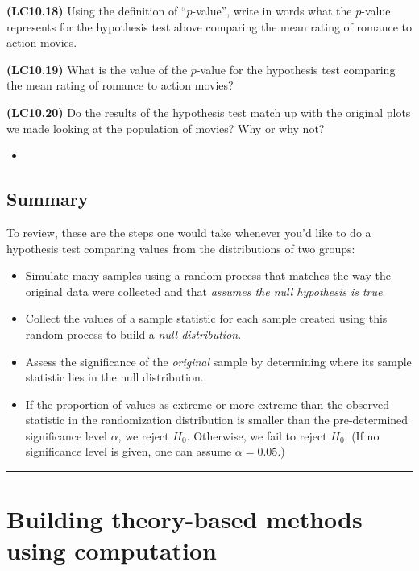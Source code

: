 \documentclass[12pt,]{krantz}
\newenvironment{rmdblock}[1]
  {\begin{shaded*}
  \begin{itemize}
  \renewcommand{\labelitemi}{
    \raisebox{-.7\height}[0pt][0pt]{
    }
  }
  \item
  }
  {
  \end{itemize}
  \end{shaded*}
  }
\newenvironment{learncheck}
  {\begin{rmdblock}{warning}}
  {\end{rmdblock}}
\begin{document}
\textbf{(LC10.18)} Using the definition of ``\(p\)-value'', write in
words what the \(p\)-value represents for the hypothesis test above
comparing the mean rating of romance to action movies.

\textbf{(LC10.19)} What is the value of the \(p\)-value for the
hypothesis test comparing the mean rating of romance to action movies?

\textbf{(LC10.20)} Do the results of the hypothesis test match up with
the original plots we made looking at the population of movies? Why or
why not?

\begin{learncheck}

\end{learncheck}

\subsection{Summary}\label{summary-5}

To review, these are the steps one would take whenever you'd like to do
a hypothesis test comparing values from the distributions of two groups:

\begin{itemize}
\item
  Simulate many samples using a random process that matches the way the
  original data were collected and that \emph{assumes the null
  hypothesis is true}.
\item
  Collect the values of a sample statistic for each sample created using
  this random process to build a \emph{null distribution}.
\item
  Assess the significance of the \emph{original} sample by determining
  where its sample statistic lies in the null distribution.
\item
  If the proportion of values as extreme or more extreme than the
  observed statistic in the randomization distribution is smaller than
  the pre-determined significance level \(\alpha\), we reject \(H_0\).
  Otherwise, we fail to reject \(H_0\). (If no significance level is
  given, one can assume \(\alpha = 0.05\).)
\end{itemize}

\begin{center}\rule{0.5\linewidth}{\linethickness}\end{center}

\section{Building theory-based methods using
computation}\label{theory-hypo}
\end{document}
